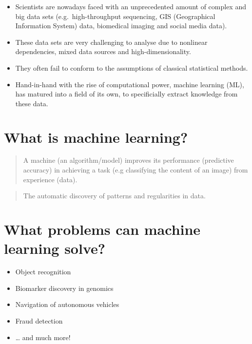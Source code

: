 \documentclass[]{book}
\providecommand{\tightlist}{%
  \setlength{\itemsep}{0pt}\setlength{\parskip}{0pt}}
\begin{document}
\begin{itemize}
\tightlist
\item
  Scientists are nowadays faced with an unprecedented amount of complex and big data sets
  (e.g.~high-throughput sequencing, GIS (Geographical Information System) data, biomedical imaging and social media data).
\item
  These data sets are very challenging to analyse due to nonlinear dependencies, mixed data sources and high-dimensionality.
\item
  They often fail to conform to the assumptions of classical statistical methods.
\item
  Hand-in-hand with the rise of computational power, machine learning (ML), has matured into a field of its own,
  to specificially extract knowledge from these data.
\end{itemize}

\hypertarget{what-is-machine-learning}{%
\section{What is machine learning?}\label{what-is-machine-learning}}

\begin{quote}
A machine (an algorithm/model) improves its performance (predictive accuracy) in achieving a task (e.g
classifying the content of an image) from experience (data).
\end{quote}

\begin{quote}
The automatic discovery of patterns and regularities in data.
\end{quote}

\hypertarget{what-problems-can-machine-learning-solve}{%
\section{What problems can machine learning solve?}\label{what-problems-can-machine-learning-solve}}

\begin{itemize}
\item
  Object recognition
\item
  Biomarker discovery in genomics
\item
  Navigation of autonomous vehicles
\item
  Fraud detection
\item
  \ldots{} and much more!
\end{itemize}
\end{document}
